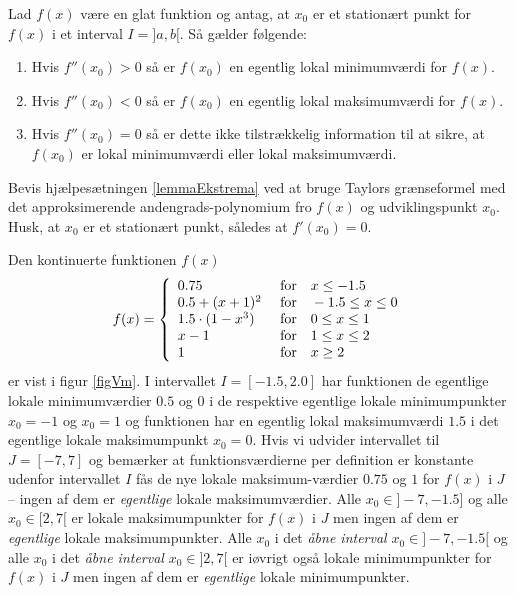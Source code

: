 \begin{lemma} \label{lemmaEkstrema}
Lad $f(x)$ være en glat funktion og antag, at $x_{0}$ er et stationært punkt for $f(x)$ i et interval $I = ]a, b[$.
Så gælder følgende:
\begin{enumerate}
\item Hvis $f''(x_{0}) > 0$ så er  $f(x_{0})$ en egentlig lokal minimumværdi for $f(x)$.
\item Hvis $f''(x_{0}) < 0$ så er $f(x_{0})$ en egentlig lokal maksimumværdi for $f(x)$.
\item Hvis $f''(x_{0}) = 0$ så er dette ikke tilstrækkelig information til at sikre, at $f(x_{0})$ er lokal minimumværdi eller lokal maksimumværdi.
\end{enumerate}
\end{lemma}

\begin{exercise}
Bevis hjælpesætningen \ref{lemmaEkstrema} ved at bruge Taylors grænseformel med det approksimerende andengrads-polynomium fro $f(x)$  og udviklingspunkt $x_{0}$. Husk, at $x_{0}$ er et stationært punkt, således at $f'(x_{0}) = 0$.
\end{exercise}


\begin{example} \label{exampLokMinMax}
Den kontinuerte funktionen $f(x)$
\begin{equation}
f(x) = \left\{
        \begin{array}{ll}
         0.75 \, \,  & \hbox{for} \quad x \leq -1.5 \\
           0.5 + (x+1)^{2} \, \,  & \hbox{for} \quad -1.5 \leq x \leq 0  \\
           1.5\cdot(1-x^{3}) \, \,  & \hbox{for} \quad 0 \leq x \leq 1  \\
              x-1 \, \,  & \hbox{for} \quad 1 \leq x \leq 2  \\
          1 \, \, & \hbox{for} \quad x \geq 2
        \end{array}
      \right.
\end{equation}
er vist i figur \ref{figVm}. I intervallet $I = [-1.5, 2.0]$ har funktionen de egentlige lokale minimumværdier $0.5$ og $0$
i de respektive egentlige lokale minimumpunkter $x_{0}= -1$ og $x_{0}= 1$ og funktionen har en egentlig lokal maksimumværdi $1.5$ i det egentlige lokale maksimumpunkt $x_{0}=0$. Hvis vi udvider intervallet til $J = [-7, 7]$ og bemærker at funktionsværdierne per definition er konstante udenfor intervallet $I$ fås de nye lokale maksimum-værdier $0.75$ og $1$ for $f(x)$ i $J$ -- ingen af dem er {\emph{egentlige}} lokale maksimumværdier.  Alle $x_{0} \in ]-7, -1.5]$ og alle $x_{0} \in [2, 7[$ er
lokale maksimumpunkter for $f(x)$ i $J$ men ingen af dem er {\emph{egentlige}} lokale maksimumpunkter. Alle $x_{0}$ i det {\emph{åbne interval}} $x_{0} \in ]-7, -1.5[$ og alle $x_{0}$ i det {\emph{åbne interval}} $x_{0} \in ]2, 7[$ er iøvrigt også
lokale minimumpunkter for $f(x)$ i $J$ men ingen af dem er {\emph{egentlige}} lokale minimumpunkter.
\end{example}


